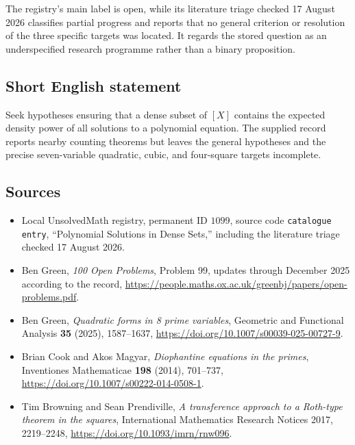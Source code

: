 \documentclass[11pt]{article}
\begin{document}
The registry's main label is open, while its literature triage checked 17 August 2026 classifies partial progress and reports that no general criterion or resolution of the three specific targets was located. It regards the stored question as an underspecified research programme rather than a binary proposition.
\subsection{Short English statement}
Seek hypotheses ensuring that a dense subset of $[X]$ contains the expected density power of all solutions to a polynomial equation. The supplied record reports nearby counting theorems but leaves the general hypotheses and the precise seven-variable quadratic, cubic, and four-square targets incomplete.
\subsection{Sources}
\begin{itemize}
\item Local UnsolvedMath registry, permanent ID $1099$, source code \texttt{catalogue entry}, ``Polynomial Solutions in Dense Sets,'' including the literature triage checked 17 August 2026.
\item Ben Green, \emph{100 Open Problems}, Problem 99, updates through December 2025 according to the record, \url{https://people.maths.ox.ac.uk/greenbj/papers/open-problems.pdf}.
\item Ben Green, \emph{Quadratic forms in 8 prime variables}, Geometric and Functional Analysis \textbf{35} (2025), 1587--1637, \url{https://doi.org/10.1007/s00039-025-00727-9}.
\item Brian Cook and Akos Magyar, \emph{Diophantine equations in the primes}, Inventiones Mathematicae \textbf{198} (2014), 701--737, \url{https://doi.org/10.1007/s00222-014-0508-1}.
\item Tim Browning and Sean Prendiville, \emph{A transference approach to a Roth-type theorem in the squares}, International Mathematics Research Notices 2017, 2219--2248, \url{https://doi.org/10.1093/imrn/rnw096}.
\end{itemize}
\end{document}
